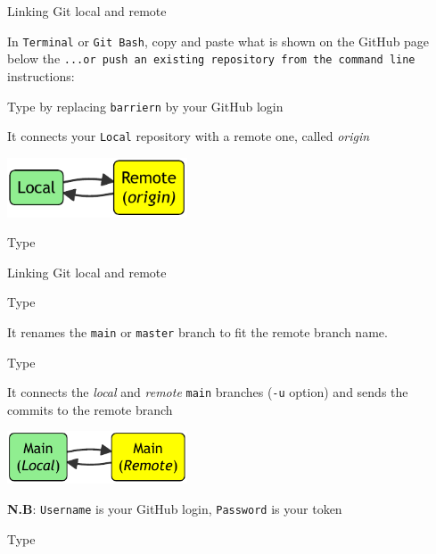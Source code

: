 \documentclass[10pt]{beamer}
\begin{document}
\begin{frame}[fragile]{Linking Git local and remote}
\protect\hypertarget{synchronization-to-the-remote}{}

In \texttt{Terminal} or \texttt{Git\ Bash}, copy and paste what is
shown on the GitHub page below the
\texttt{...or\ push\ an\ existing\ repository\ from\ the\ command\ line} instructions:

Type  by replacing \verb+barriern+ by your GitHub login

It connects your \verb+Local+ repository with a remote one, called
\emph{origin}

\begin{center}
 \includegraphics[width=0.4\textwidth]{mermaid/diagram-1-1.pdf}
\end{center}

Type 

\end{frame}

\begin{frame}[fragile]{Linking Git local and remote}

Type 

It renames the \verb+main+ or \verb+master+ branch to fit the remote branch name.

Type 

It connects the \emph{local} and \emph{remote} \verb+main+ branches (\verb+-u+ option) and sends the commits to the remote branch 

\begin{center}
 \includegraphics[width=0.4\textwidth]{mermaid/diagram-2-1.pdf}
\end{center}

\textbf{N.B}: \texttt{Username} is your GitHub login, \texttt{Password} is your token

Type 

\end{frame}
\end{document}
